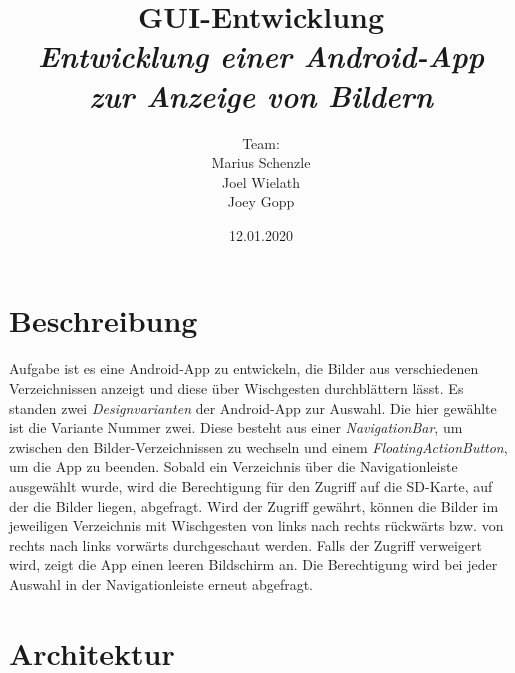 

\title{\textbf{GUI-Entwicklung}\\\textit{Entwicklung einer Android-App\\zur Anzeige von Bildern}}
\author{Team:\\Marius Schenzle\\Joel Wielath\\Joey Gopp}
\date{12.01.2020}


\doublespacing
{}
\maketitle
\newpage
\tableofcontents
\newpage
\singlespacing
{}

\newpage
\section{Beschreibung}

Aufgabe ist es eine Android-App zu entwickeln, die Bilder aus verschiedenen Verzeichnissen anzeigt und diese über Wischgesten durchblättern lässt.
Es standen zwei \textit{Designvarianten} der Android-App zur Auswahl.
Die hier gewählte ist die Variante Nummer zwei. Diese besteht aus einer \textit{NavigationBar}, um zwischen den Bilder-Verzeichnissen zu wechseln und einem \textit{FloatingActionButton}, um die App zu beenden. Sobald ein Verzeichnis über die Navigationleiste ausgewählt wurde, wird die Berechtigung für den Zugriff auf die SD-Karte, auf der die Bilder liegen, abgefragt. Wird der Zugriff gewährt, können die Bilder im jeweiligen Verzeichnis mit Wischgesten von links nach rechts rückwärts bzw. von rechts nach links vorwärts durchgeschaut werden. Falls der Zugriff verweigert wird, zeigt die App einen leeren Bildschirm an. Die Berechtigung wird bei jeder Auswahl in der Navigationleiste erneut abgefragt.

\newpage
\section{Architektur}

